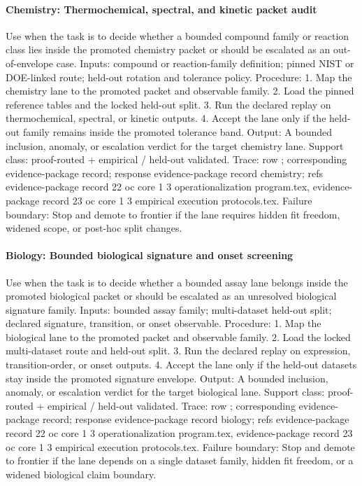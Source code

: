 \paragraph{Chemistry: Thermochemical, spectral, and kinetic packet audit}
Use when the task is to decide whether a bounded compound family or reaction class lies inside the promoted chemistry packet or should be escalated as an out-of-envelope case.
Inputs: compound or reaction-family definition; \allowbreak pinned NIST or DOE-linked route; \allowbreak held-out rotation and tolerance policy.
Procedure: 1. Map the chemistry lane to the promoted packet and observable family. 2. Load the pinned reference tables and the locked held-out split. 3. Run the declared replay on thermochemical, spectral, or kinetic outputs. 4. Accept the lane only if the held-out family remains inside the promoted tolerance band.
Output: A bounded inclusion, anomaly, or escalation verdict for the target chemistry lane.
Support class: proof-routed + empirical / held-out validated.
Trace: row ; corresponding evidence-package record; \allowbreak response evidence-package record chemistry; \allowbreak refs evidence-package record 22 oc core 1 3 operationalization program.tex, \allowbreak evidence-package record 23 oc core 1 3 empirical execution protocols.tex.
Failure boundary: Stop and demote to frontier if the lane requires hidden fit freedom, widened scope, or post-hoc split changes.

\paragraph{Biology: Bounded biological signature and onset screening}
Use when the task is to decide whether a bounded assay lane belongs inside the promoted biological packet or should be escalated as an unresolved biological signature family.
Inputs: bounded assay family; \allowbreak multi-dataset held-out split; \allowbreak declared signature, transition, or onset observable.
Procedure: 1. Map the biological lane to the promoted packet and observable family. 2. Load the locked multi-dataset route and held-out split. 3. Run the declared replay on expression, transition-order, or onset outputs. 4. Accept the lane only if the held-out datasets stay inside the promoted signature envelope.
Output: A bounded inclusion, anomaly, or escalation verdict for the target biological lane.
Support class: proof-routed + empirical / held-out validated.
Trace: row ; corresponding evidence-package record; \allowbreak response evidence-package record biology; \allowbreak refs evidence-package record 22 oc core 1 3 operationalization program.tex, \allowbreak evidence-package record 23 oc core 1 3 empirical execution protocols.tex.
Failure boundary: Stop and demote to frontier if the lane depends on a single dataset family, hidden fit freedom, or a widened biological claim boundary.

